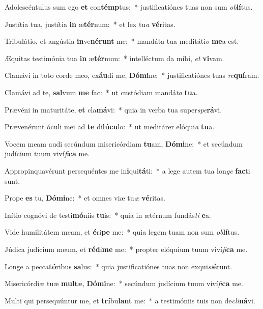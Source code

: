 \item Adolescéntulus sum ego \textbf{et} con\textbf{témp}tus:~* justificatiónes tuas non sum \textit{ob}\textbf{lí}tus.
\item Justítia tua, justítia \textbf{in} æ\textbf{tér}num:~* et lex tu\textit{a} \textbf{vé}ritas.
\item Tribulátio, et angústia \textbf{in}ve\textbf{né}\textbf{runt} me:~* mandáta tua meditáti\textit{o} \textbf{me}a est.
\item Æquitas testimónia tua \textbf{in} æ\textbf{tér}num:~* intelléctum da mihi, \textit{et} \textbf{vi}vam.
\item Clamávi in toto corde meo, ex\textbf{áu}di me, \textbf{Dó}\textbf{mi}ne:~* justificatiónes tuas \textit{re}\textbf{quí}ram.
\item Clamávi ad te, \textbf{sal}vum \textbf{me} fac:~* ut custódiam mandá\textit{ta} \textbf{tu}a.
\item Prævéni in maturitáte, \textbf{et} cla\textbf{má}vi:~* quia in verba tua super\textit{spe}\textbf{rá}vi.
\item Prævenérunt óculi mei ad \textbf{te} di\textbf{lú}\textbf{cu}lo:~* ut meditárer elóqui\textit{a} \textbf{tu}a.
\item Vocem meam audi secúndum misericórdiam \textbf{tu}am, \textbf{Dó}\textbf{mi}ne:~* et secúndum judícium tuum viví\textit{fi}\textbf{ca} me.
\item Appropinquavérunt persequéntes me in\textbf{i}qui\textbf{tá}ti:~* a lege autem tua lon\textit{ge} \textbf{fac}ti sunt.
\item Prope \textbf{es} tu, \textbf{Dó}\textbf{mi}ne:~* et omnes viæ tu\textit{æ} \textbf{vé}ritas.
\item Inítio cognóvi de testi\textbf{mó}niis \textbf{tu}is:~* quia in ætérnum fundás\textit{ti} \textbf{e}a.
\item Vide humilitátem meam, et \textbf{é}ri\textbf{pe} me:~* quia legem tuam non sum \textit{ob}\textbf{lí}tus.
\item Júdica judícium meum, et \textbf{réd}i\textbf{me} me:~* propter elóquium tuum viví\textit{fi}\textbf{ca} me.
\item Longe a pecca\textbf{tó}ribus \textbf{sa}lus:~* quia justificatiónes tuas non exqui\textit{si}\textbf{é}runt.
\item Misericórdiæ tuæ \textbf{mul}tæ, \textbf{Dó}\textbf{mi}ne:~* secúndum judícium tuum viví\textit{fi}\textbf{ca} me.
\item Multi qui persequúntur me, et \textbf{trí}bu\textbf{lant} me:~* a testimóniis tuis non de\textit{cli}\textbf{ná}vi.
